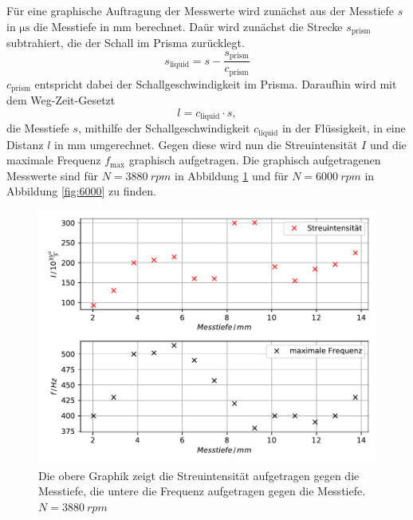 Für eine graphische Auftragung der Messwerte wird zunächst aus der Messtiefe $s$ in $\si{\micro\second}$ die Messtiefe in $\si{\milli\meter}$ berechnet.
Daür wird zunächst die Strecke $s_\text{prism}$ subtrahiert, die der Schall im Prisma zurücklegt.
\begin{equation*}
 s_\text{liquid} = s - \frac{s_\text{prism}}{c_\text{prism}}
\end{equation*}
$c_\text{prism}$ entspricht dabei der Schallgeschwindigkeit im Prisma.
Daraufhin wird mit dem Weg-Zeit-Gesetzt
\begin{equation*}
l = c_\text{liquid} \cdot s,
\end{equation*}
die Messtiefe $s$, mithilfe der Schallgeschwindigkeit $c_\text{liquid}$ in der Flüssigkeit, in eine Distanz $l$ in $\si{\milli\meter}$ umgerechnet.
Gegen diese wird nun die Streuintensität $I$ und die maximale Frequenz $f_\text{max}$ graphisch aufgetragen.
Die graphisch aufgetragenen Messwerte sind für $N = \SI{3880}{rpm}$ in Abbildung \ref{fig:3880} und für $N = \SI{6000}{rpm}$ in Abbildung \ref{fig:6000} zu finden.

\begin{figure}
    \centering
    \includegraphics[width=\textwidth]{content/data/depth_3880.pdf}
    \caption{Die obere Graphik zeigt die Streuintensität aufgetragen gegen die Messtiefe, die untere die Frequenz aufgetragen gegen die Messtiefe. $N=\SI{3880}{rpm}$}
    \label{fig:3880}
\end{figure}

